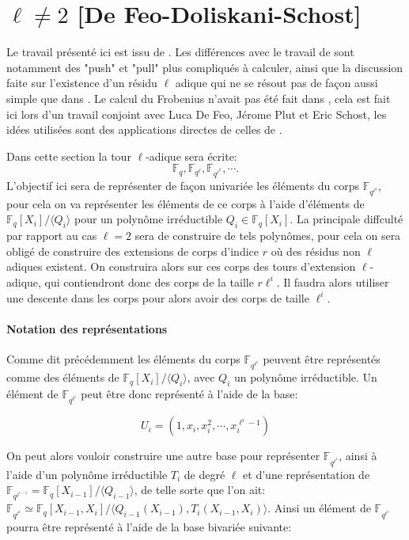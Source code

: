 \documentclass[10pt,a4paper]{book}
\theoremstyle{plain}
\theoremstyle{definition}
\theoremstyle{definition}
\theoremstyle{definition}
\theoremstyle{definition}
\theoremstyle{remark}
\theoremstyle{remark}
\begin{document}
\section{$\ell \neq 2$ [De Feo-Doliskani-Schost]}

Le travail présenté ici est issu de \cite{DeFeo-Doliskani-Schost13}. Les différences avec le travail de \cite{Doliskani-Schost15} sont notamment des "push" et "pull" plus compliqués à calculer, ainsi que la discussion faite sur l'existence d'un résidu $\ell$ adique qui ne se résout pas de façon aussi simple que dans \cite{Doliskani-Schost15}. Le calcul du Frobenius n'avait pas été fait dans \cite{DeFeo-Doliskani-Schost13}, cela est fait ici lors d'un travail conjoint avec Luca De Feo, Jérome Plut et Eric Schost, les idées utilisées sont des applications directes de celles de \cite{Doliskani-Schost15}.

Dans cette section la tour $\ell$-adique sera écrite:
\[
\mathbb{F}_q, \mathbb{F}_{q^\ell}, \mathbb{F}_{q^{\ell^2}}, \cdots.
\]
L'objectif ici sera de représenter de façon univariée les éléments du corps $\mathbb{F}_{q^{\ell^i}}$, pour cela on va représenter les éléments de ce corps à l'aide d'éléments de $\mathbb{F}_{q}[X_i]/\langle Q_i \rangle$ pour un polynôme irréductible $Q_i \in \mathbb{F}_q[X_i]$. La principale diffculté par rapport au cas $\ell=2$ sera de construire de tels polynômes, pour cela on sera obligé de construire des extensions de corps d'indice $r$ où des résidus non $\ell$ adiques existent. On construira alors sur ces corps des tours d'extension $\ell$-adique, qui contiendront donc des corps de la taille $r\ell^i$. Il faudra alors utiliser une descente dans les corps pour alors avoir des corps de taille $\ell^i$.

\paragraph{Notation des représentations}
Comme dit précédemment les éléments du corps $\mathbb{F}_{q^{\ell^i}}$ peuvent être représentés comme des éléments de $\mathbb{F}_q[X_i]/\langle Q_i \rangle $, avec $Q_i$ un polynôme irréductible. Un élément de $\mathbb{F}_{q^{\ell^i}}$ peut être donc représenté à l'aide de la base:

\[
U_i=(1,x_i,x_i^2,\cdots,x_i^{\ell^i-1})
\]

On peut alors vouloir construire une autre base pour représenter $\mathbb{F}_{q^{\ell^i}}$, ainsi à l'aide d'un polynôme irréductible $T_{i}$ de degré $\ell$ et d'une représentation de $\mathbb{F}_{q^{\ell^{i-1}}}=\mathbb{F}_q[X_{i-1}]/\langle Q_{i-1} \rangle $, de telle sorte que l'on ait: $\mathbb{F}_{q^{\ell^{i}}}\simeq \mathbb{F}_q[X_{i-1},X_{i}]/\langle Q_{i-1}(X_{i-1}), T_i(X_{i-1},X_{i}) \rangle $. Ainsi un élément de $\mathbb{F}_{q^{\ell^{i}}}$ pourra être représenté à l'aide de la base bivariée suivante:
\end{document}
